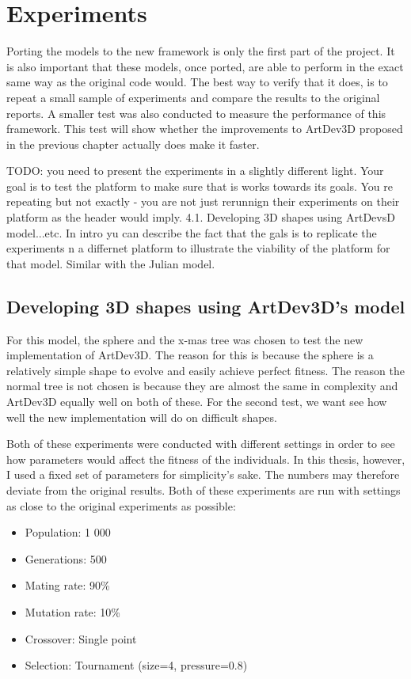 \section{Experiments}
\label{sec:experiments}
Porting the models to the new framework is only the first part of the project. It is also important that these models, once ported, are able to perform in the exact same way as the original code would. The best way to verify that it does, is to repeat a small sample of experiments and compare the results to the original reports. A smaller test was also conducted to measure the performance of this framework. This test will show whether the improvements to ArtDev3D proposed in the previous chapter actually does make it faster.

TODO:
you need to present the experiments in a slightly different light. Your goal is to test the platform to make sure that is works towards its goals. You re repeating but not exactly - you are not just rerunnign their experiments on their platform as the header would imply. 4.1. Developing 3D shapes using ArtDevsD model...etc. In intro yu can describe the fact that the gals is to replicate the experiments n a differnet platform to illustrate the viability of the platform for that model. Similar with the Julian model.


\subsection{Developing 3D shapes using ArtDev3D's model}
For this model, the sphere and the x-mas tree was chosen to test the new implementation of ArtDev3D. The reason for this is because the sphere is a relatively simple shape to evolve and easily achieve perfect fitness. The reason the normal tree is not chosen is because they are almost the same in complexity and ArtDev3D equally well on both of these. For the second test, we want see how well the new implementation will do on difficult shapes.

Both of these experiments were conducted with different settings in order to see how parameters would affect the fitness of the individuals. In this thesis, however, I used a fixed set of parameters for simplicity's sake. The numbers may therefore deviate from the original results. Both of these experiments are run with settings as close to the original experiments as possible:

\begin{itemize}
	\itemsep=-2pt
	\item Population: 1 000
	\item Generations: 500
	\item Mating rate: 90\%
	\item Mutation rate: 10\%
	\item Crossover: Single point
	\item Selection: Tournament (size=4, pressure=0.8)
\end{itemize}

